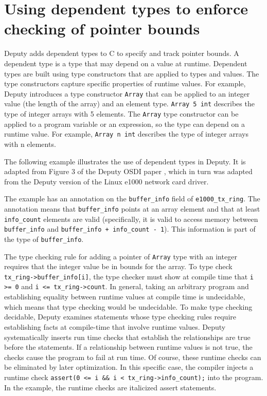 \section{Using dependent types to enforce checking of pointer bounds}

Deputy adds dependent types to C to specify and track pointer bounds. A
dependent type is a type that may depend on a value at runtime.
Dependent types are built using type constructors that are applied to
types and values. The type constructors capture specific properties of
runtime values. For example, Deputy introduces a type constructor
\verb|Array| that can be applied to an integer value (the length of the
array) and an element type. \verb|Array 5 int| describes the type of
integer arrays with 5 elements. The \verb|Array| type constructor can be
applied to a program variable or an expression, so the type can depend
on a runtime value. For example, \verb|Array n int| describes the type
of integer arrays with n elements.

The following example illustrates the use of dependent types in Deputy.
It is adapted from Figure 3 of the Deputy OSDI paper , which in turn was
adapted from the Deputy version of the Linux e1000 network card driver.

The example has an annotation on the \texttt{buffer\_info} field of
\texttt{e1000\_tx\_ring}. The annotation means that
\texttt{buffer\_info} points at an array element and that at least
\texttt{info\_count} elements are valid (specifically, it is valid to
access memory between \texttt{buffer\_info} and \texttt{buffer\_info +
info\_count - 1}). This information is part of the type of
\texttt{buffer\_info}.

The type checking rule for adding a pointer of \verb|Array| type with an
integer requires that the integer value be in bounds for the array. To
type check \texttt{tx\_ring-\textgreater{}buffer\_info[i]}, the type
checker must show at compile time that \texttt{i >= 0} and
\texttt{i <= tx\_ring->count}. In general, taking
an arbitrary program and establishing equality between runtime values at
compile time is undecidable, which means that type checking would be
undecidable. To make type checking decidable, Deputy examines statements
whose type checking rules require establishing facts at compile-time
that involve runtime values. Deputy systematically inserts run time
checks that establish the relationships are true before the statements.
If a relationship between runtime values is not true, the checks cause
the program to fail at run time. Of course, these runtime checks can be
eliminated by later optimization. In this specific case, the compiler
injects a runtime check \verb|assert(0 <= i && i < tx_ring->info_count);| into the program. 
In the example, the runtime checks are italicized assert statements.

